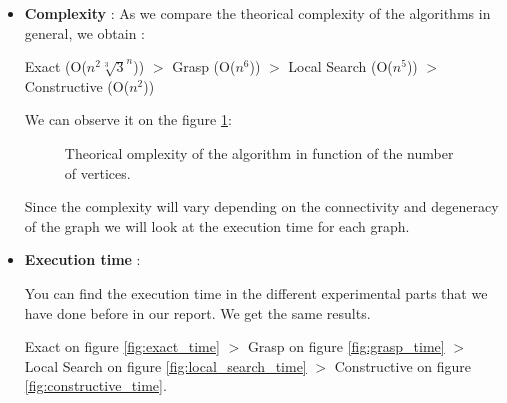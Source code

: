 \begin{itemize}
    \item \textbf{Complexity} : As we compare the theorical complexity of the algorithms in general, we obtain : \bigskip
    
    Exact (O($n^2\sqrt[3]{3}^n$)) $>$ Grasp (O($n^6$)) $>$ Local Search (O($n^5$)) $>$ Constructive (O($n^2$)) \bigskip

    We can observe it on the figure \ref{fig:theorical_algorithm_complexity}:

    \begin{figure}[H]
        \centering
        \caption{Theorical omplexity of the algorithm in function of the number of vertices.}
        \label{fig:theorical_algorithm_complexity}
    \end{figure}
    
    Since the complexity will vary depending on the connectivity and degeneracy of the graph we will look at the execution time for each graph.
    
    \item \textbf{Execution time} : \bigskip
    
    You can find the execution time in the different experimental parts that we have done before in our report. We get the same results. \bigskip
    
    Exact on figure \ref{fig:exact_time} $>$ Grasp on figure \ref{fig:grasp_time} $>$ Local Search on figure \ref{fig:local_search_time} $>$ Constructive on figure \ref{fig:constructive_time}.
\end{itemize}


